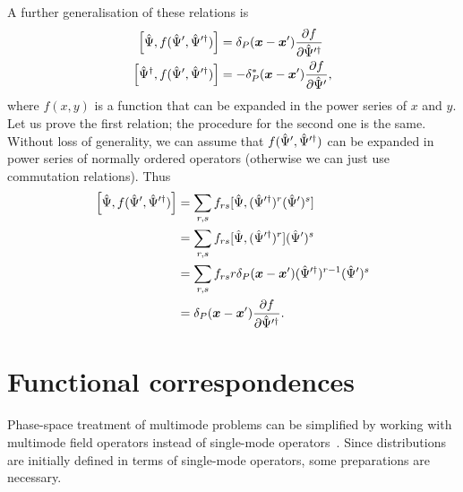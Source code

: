 A further generalisation of these relations is
\begin{equation}
\label{eqn:multimode-formalism:functional-commutators}
\begin{split}
	\left[ \hat{\Psi}, f( \hat{\Psi}^\prime, \hat{\Psi}^{\prime\dagger} ) \right]
	& = \delta_P (\boldsymbol{x} - \boldsymbol{x}^\prime) \frac{\partial f}{\partial \hat{\Psi}^{\prime\dagger}} \\
	\left[ \hat{\Psi}^\dagger, f( \hat{\Psi}^\prime, \hat{\Psi}^{\prime\dagger} ) \right]
	& = -\delta_P^* (\boldsymbol{x} - \boldsymbol{x}^\prime) \frac{\partial f}{\partial \hat{\Psi}^\prime},
\end{split}
\end{equation}
where $f(x, y)$ is a function that can be expanded in the power series of $x$ and $y$.
Let us prove the first relation; the procedure for the second one is the same.
Without loss of generality, we can assume that $f(\hat{\Psi}^\prime, \hat{\Psi}^{\prime\dagger})$ can be expanded in power series of normally ordered operators (otherwise we can just use commutation relations).
Thus
\begin{equation*}
\begin{split}
	\left[ \hat{\Psi}, f( \hat{\Psi}^\prime, \hat{\Psi}^{\prime\dagger} ) \right]
	& = \sum\limits_{r,s} f_{rs} [ \hat{\Psi}, (\hat{\Psi}^{\prime\dagger})^r (\hat{\Psi}^\prime)^s ] \\
	& = \sum\limits_{r,s} f_{rs} [ \hat{\Psi}, (\hat{\Psi}^{\prime\dagger})^r ] (\hat{\Psi}^\prime)^s \\
	& = \sum\limits_{r,s} f_{rs} r \delta_P(\boldsymbol{x} - \boldsymbol{x}^\prime)
		(\hat{\Psi}^{\prime\dagger})^{r-1} (\hat{\Psi}^\prime)^s \\
	& = \delta_P (\boldsymbol{x} - \boldsymbol{x}^\prime) \frac{\partial f}{\partial \hat{\Psi}^{\prime\dagger}}.
\end{split}
\end{equation*}


\section{Functional correspondences}

Phase-space treatment of multimode problems can be simplified by working with multimode field operators instead of single-mode operators~\cite{Steel1998,Norrie2006a}.
Since distributions are initially defined in terms of single-mode operators, some preparations are necessary.

